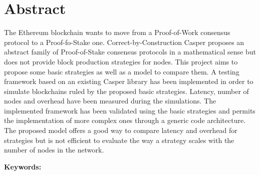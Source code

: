 \chapter*{Abstract}

The Ethereum blockchain wants to move from a Proof-of-Work consensus protocol to
a Proof-fo-Stake one. Correct-by-Construction Casper proposes an abstract family
of Proof-of-Stake consensus protocols in a mathematical sense but does not
provide block production strategies for nodes. This project aims to propose some
basic strategies as well as a model to compare them. A testing framework based
on an existing Casper library has been implemented in order to simulate
blockchains ruled by the proposed basic strategies. Latency, number of nodes and
overhead have been measured during the simulations.
The implemented framework has been validated using the basic strategies and
permits the implementation of more complex ones through a generic code
architecture. The proposed model offers a good way to compare latency and
overhead for strategies but is not efficient to evaluate the way a strategy scales
with the number of nodes in the network.


\vskip0.5cm
\noindent\textbf{Keywords:}
\Keywords
